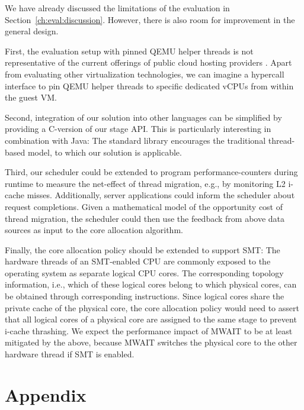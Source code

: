 \documentclass[12pt,a4paper]{book}
\begin{document}
We have already discussed the limitations of the evaluation in Section~\ref{ch:eval:discussion}.
However, there is also room for improvement in the general design.

First, the evaluation setup with pinned QEMU helper threads is not representative of the current offerings of public cloud hosting providers .
Apart from evaluating other virtualization technologies, we can imagine a hypercall interface to pin QEMU helper threads to specific dedicated vCPUs from within the guest VM.


Second, integration of our solution into other languages can be simplified by providing a C-version of our stage API.
This is particularly interesting in combination with Java:
The standard library encourages the traditional thread-based model, to which our solution is applicable.~\cite{javaThreadConcurrency}

Third, our scheduler could be extended to program performance-counters during runtime to measure the net-effect of thread migration, e.g., by monitoring L2 i-cache misses.
Additionally, server applications could inform the scheduler about request completions.
Given a mathematical model of the opportunity cost of thread migration, the scheduler could then use the feedback from above data sources as input to the core allocation algorithm.

Finally, the core allocation policy should be extended to support SMT:
The hardware threads of an SMT-enabled CPU are commonly exposed to the operating system as separate logical CPU cores.
The corresponding topology information, i.e., which of these logical cores belong to which physical cores, can be obtained through corresponding instructions.
Since logical cores share the private cache of the physical core, the core allocation policy would need to assert that all logical cores of a physical core are assigned to the same stage to prevent i-cache thrashing.
We expect the performance impact of MWAIT to be at least mitigated by the above, because MWAIT switches the physical core to the other hardware thread if SMT is enabled.~\cite{intelSDMHyperthreading}


\backmatter

\chapter{Appendix}
\end{document}
